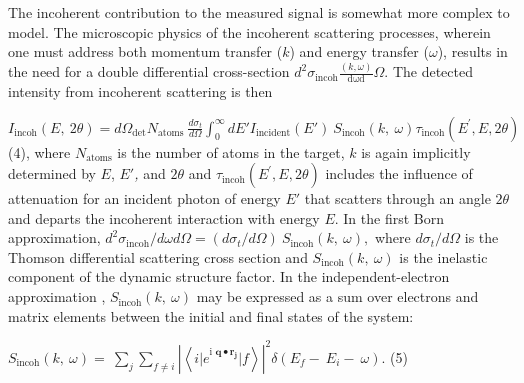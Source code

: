 The incoherent contribution to the measured signal is somewhat more
complex to model. The microscopic physics of the incoherent scattering
processes, wherein one must address both momentum transfer (\(k\)) and
energy transfer ($\omega$), results in the need for a double
differential cross-section
\(d^{2}\sigma_{\text{incoh}}\frac{\left( k,\omega \right)}{\text{dωd}}\Omega\).
The detected intensity from incoherent scattering is then

\(I_{\text{incoh}}\left( E,\ 2\theta \right) = d\Omega_{\det}N_{\text{atoms}}\ \frac{d\sigma_{t}}{d\Omega}\int_{0}^{\infty}{dE'I_{\text{incident}}\left( E' \right)}\ S_{\text{incoh}}\left( k,\ \omega \right)\tau_{\text{incoh}}\left( E^{'},E,2\theta \right)\)
(4),
where \(N_{\text{atoms}}\) is the number of atoms in the target, \(k\)
is again implicitly determined by \(E\), \(E'\)\emph{,} and \(2\theta\)
and \(\tau_{\text{incoh}}\left( E^{'},E,2\theta \right)\) includes the
influence of attenuation for an incident photon of energy \(E'\) that
scatters through an angle \(2\theta\) and departs the incoherent
interaction with energy \(E\). In the first Born approximation,
\(d^{2}\sigma_{\text{incoh}}/d\omega d\Omega = (d\sigma_{t}/d\Omega)\ S_{\text{incoh}}\left( k,\ \omega \right),\)
where \(d\sigma_{t}/d\Omega\) is the Thomson differential scattering
cross section and \(S_{\text{incoh}}\left( k,\ \omega \right)\) is the
inelastic component of the dynamic structure factor. In the
independent-electron approximation
 \cite{chihara2000interaction, SCHULKE2007ELECTRON},
\(S_{\text{incoh}}\left( k,\ \omega \right)\) may be expressed as a sum
over electrons and matrix elements between the initial and final states
of the system:

\(S_{\text{incoh}}\left( k,\ \omega \right) = \ \sum_{j}^{}{\sum_{f \neq i}^{}{\left| \left\langle {i|e}^{\text{i\ }\mathbf{q \bullet}\mathbf{r}_{\mathbf{j}}}|f \right\rangle \right|^{2}\delta(E_{f} - \ E_{i} - \ \omega)}}\).
(5)

